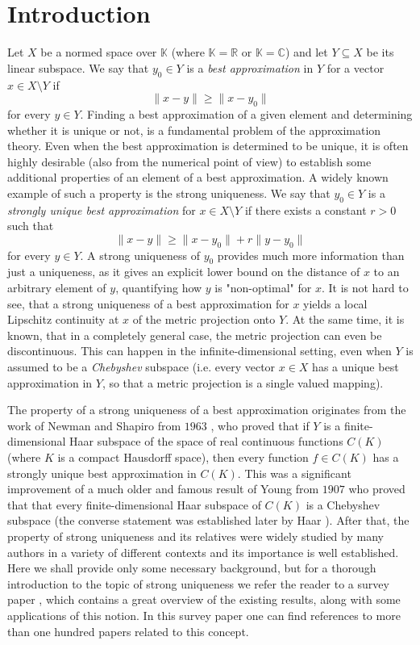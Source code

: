 \documentclass[12pt, reqno]{amsart}
\theoremstyle{definition}
\theoremstyle{remark}
\numberwithin{equation}{section}
\begin{document}
\section{Introduction}
Let $X$ be a normed space over $\mathbb{K}$ (where $\mathbb{K}=\mathbb{R}$ or $\mathbb{K}=\mathbb{C}$) and let $Y \subseteq X$ be its linear subspace. We say that $y_0 \in Y$ is a \emph{best approximation} in $Y$ for a vector $x \in X \setminus Y$ if 
$$\|x-y\| \geq \|x-y_0\|$$
for every $y \in Y$. Finding a best approximation of a given element and determining whether it is unique or not, is a fundamental problem of the approximation theory. Even when the best approximation is determined to be unique, it is often highly desirable (also from the numerical point of view) to establish some additional properties of an element of a best approximation. A widely known example of such a property is the strong uniqueness. We say that $y_0 \in Y$ is a \emph{strongly unique best approximation} for $x \in X \setminus Y$ if there exists a constant $r>0$ such that
$$\|x-y\| \geq \|x-y_0\| + r\|y-y_0\|$$
for every $y \in Y$. A strong uniqueness of $y_0$ provides much more information than just a uniqueness, as it gives an explicit lower bound on the distance of $x$ to an arbitrary element of $y$, quantifying how $y$ is "non-optimal" for $x$. It is not hard to see, that a strong uniqueness of a best approximation for $x$ yields a local Lipschitz continuity at $x$ of the metric projection onto $Y$. At the same time, it is known, that in a completely general case, the metric projection can even be discontinuous. This can happen in the infinite-dimensional setting, even when $Y$ is assumed to be a \emph{Chebyshev} subspace (i.e. every vector $x \in X$ has a unique best approximation in $Y$, so that a metric projection is a single valued mapping).

The property of a strong uniqueness of a best approximation originates from the work of Newman and Shapiro from $1963$ \cite{newmanshapiro}, who proved that if $Y$ is a finite-dimensional Haar subspace of the space of real continuous functions $C(K)$ (where $K$ is a compact Hausdorff space), then every function $f \in C(K)$ has a strongly unique best approximation in $C(K)$. This was a significant improvement of a much older and famous result of Young from $1907$ \cite{young} who proved that that every finite-dimensional Haar subspace of $C(K)$ is a Chebyshev subspace (the converse statement was established later by Haar \cite{haar}). After that, the property of strong uniqueness and its relatives were widely studied by many authors in a variety of different contexts and its importance is well established. Here we shall provide only some necessary background, but for a thorough introduction to the topic of strong uniqueness we refer the reader to a survey paper \cite{survey}, which contains a great overview of the existing results, along with some applications of this notion. In this survey paper one can find references to more than one hundred papers related to this concept.
\end{document}
